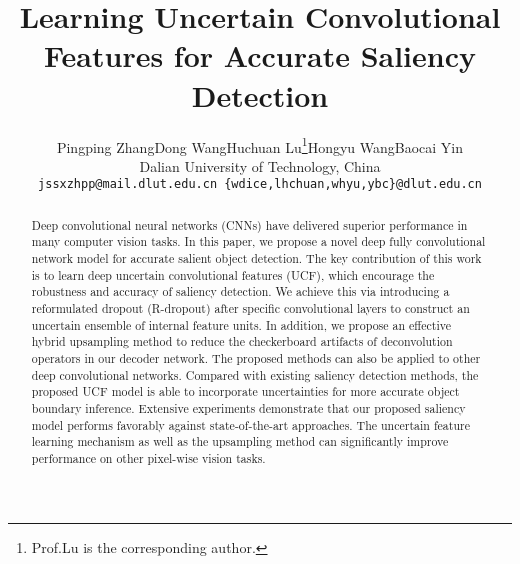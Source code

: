 \documentclass[10pt,twocolumn,letterpaper]{article}
\begin{document}
\title{Learning Uncertain Convolutional Features for Accurate Saliency Detection}

\author{Pingping Zhang\quad Dong Wang\quad Huchuan Lu\thanks{Prof.Lu is the corresponding author.}\quad Hongyu Wang\quad Baocai Yin\\
Dalian University of Technology, China\\
{\tt\small jssxzhpp@mail.dlut.edu.cn \{wdice,lhchuan,whyu,ybc\}@dlut.edu.cn}
}

\maketitle
\thispagestyle{empty}
\begin{abstract}


Deep convolutional neural networks (CNNs) have delivered superior performance in many computer vision tasks.
In this paper, we propose a novel deep fully convolutional network model for accurate salient object detection.
The key contribution of this work is to learn deep uncertain convolutional features (UCF), which encourage the robustness and accuracy of saliency detection.
We achieve this via introducing a reformulated dropout (R-dropout) after specific convolutional layers to construct an uncertain ensemble of internal feature units.
In addition, we propose an effective hybrid upsampling method to reduce the checkerboard artifacts of deconvolution operators in our decoder network.
The proposed methods can also be applied to other deep convolutional networks.
Compared with existing saliency detection methods, the proposed UCF model is able to incorporate uncertainties for more accurate object boundary inference.
Extensive experiments demonstrate that our proposed saliency model performs favorably against state-of-the-art approaches.
The uncertain feature learning mechanism as well as the upsampling method can significantly improve performance on other pixel-wise vision tasks.
\end{abstract}
\end{document}
